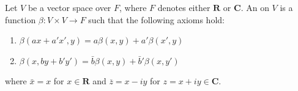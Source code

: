 Let $V$ be a vector space over $F$, where $F$ denotes either $\mathbf{R}$ or $\mathbf{C}$. An  on $V$ is a function $\beta: V \times V \rightarrow F$ such that the following axioms hold:

\begin{enumerate}
\item $\beta(ax + a'x', y) = a\beta(x, y) + a'\beta(x', y)$
\item $\beta(x, by + b'y') = \bar{b}\beta(x, y) + \bar{b}'\beta(x, y')$
\end{enumerate}

where $\bar{x} = x$ for $x \in \mathbf{R}$ and $\overline{z} = x - iy$ for $z = x + iy \in \mathbf{C}$.
